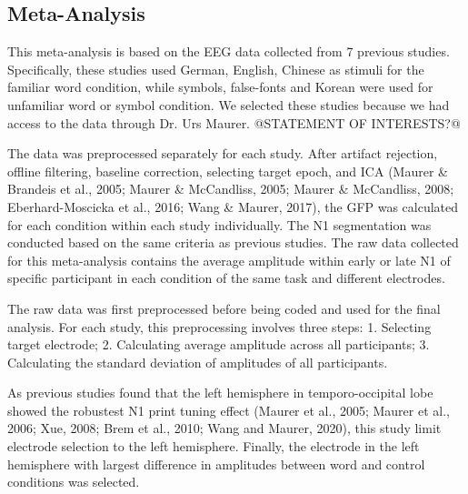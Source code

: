 \documentclass{article}
\begin{document}
\subsection{Meta-Analysis}

This meta-analysis is based on the EEG data collected from 7 previous studies. Specifically, these studies used German, English, Chinese as stimuli for the familiar word condition, while symbols, false-fonts and Korean were used for unfamiliar word or symbol condition. We selected these studies because we had access to the data through Dr. Urs Maurer. @STATEMENT OF INTERESTS?@

The data was preprocessed separately for each study. After artifact rejection, offline filtering, baseline correction, selecting target epoch, and ICA (Maurer \& Brandeis et al., 2005; Maurer \& McCandliss, 2005; Maurer \& McCandliss, 2008; Eberhard-Moscicka et al., 2016; Wang \& Maurer, 2017), the GFP was calculated for each condition within each study individually. The N1 segmentation was conducted based on the same criteria as previous studies. The raw data collected for this meta-analysis contains the average amplitude within early or late N1 of specific participant in each condition of the same task and different electrodes.

The raw data was first preprocessed before being coded and used for the final analysis. For each study, this preprocessing involves three steps: 1. Selecting target electrode; 2. Calculating average amplitude across all participants; 3. Calculating the standard deviation of amplitudes of all participants.

As previous studies found that the left hemisphere in temporo-occipital lobe showed the robustest N1 print tuning effect (Maurer et al., 2005; Maurer et al., 2006; Xue, 2008; Brem et al., 2010; Wang and Maurer, 2020), this study limit electrode selection to the left hemisphere. Finally, the electrode in the left hemisphere with largest difference in amplitudes between word and control conditions was selected.
\end{document}
